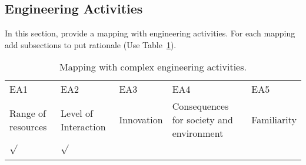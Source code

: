 \subsection{Engineering Activities}
In this section, provide a mapping with engineering activities. For each mapping add subsections to put rationale (Use Table~\ref{tab:e_act}).
\begin{center}
    \begin{table}[ht]
        \centering
                \caption{Mapping with complex engineering activities.}
        \begin{tabular}{|p{}|p{}|p{}|p{}|p{}|}
        \hline
        EA1& EA2& EA3& EA4& EA5\\
        Range of resources & Level of Interaction & Innovation & Consequences for society and environment & Familiarity\\
        \hline 
        $\sqrt{}$ & $\sqrt{}$ &&&\\
        &&&&\\
        \hline 
        \end{tabular}
        \label{tab:e_act}
    \end{table}
\end{center}
